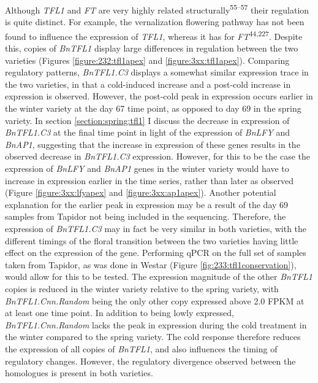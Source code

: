 \documentclass[12pt,]{book}
\begin{document}
Although \emph{TFL1} and \emph{FT} are very highly related
structurally\textsuperscript{55--57} their regulation is quite distinct.
For example, the vernalization flowering pathway has not been found to
influence the expression of \emph{TFL1}, whereas it has for
\emph{FT}\textsuperscript{44,227}. Despite this, copies of \emph{BnTFL1}
display large differences in regulation between the two varieties
(Figures \ref{figure:232:tfl1apex} and \ref{figure:3xx:tfl1apex}).
Comparing regulatory patterns, \emph{BnTFL1.C3} displays a somewhat
similar expression trace in the two varieties, in that a cold-induced
increase and a post-cold increase in expression is observed. However,
the post-cold peak in expression occurs earlier in the winter variety at
the day 67 time point, as opposed to day 69 in the spring variety. In
section \ref{section:spring:tfl1} I discuss the decrease in expression
of \emph{BnTFL1.C3} at the final time point in light of the expression
of \emph{BnLFY} and \emph{BnAP1}, suggesting that the increase in
expression of these genes results in the observed decrease in
\emph{BnTFL1.C3} expression. However, for this to be the case the
expression of \emph{BnLFY} and \emph{BnAP1} genes in the winter variety
would have to increase in expression earlier in the time series, rather
than later as observed (Figure \ref{figure:3xx:lfyapex} and
\ref{figure:3xx:ap1apex}). Another potential explanation for the earlier
peak in expression may be a result of the day 69 samples from Tapidor
not being included in the sequencing. Therefore, the expression of
\emph{BnTFL1.C3} may in fact be very similar in both varieties, with the
different timings of the floral transition between the two varieties
having little effect on the expression of the gene. Performing qPCR on
the full set of samples taken from Tapidor, as was done in Westar
(Figure \ref{fig:233:tfl1conservation}), would allow for this to be
tested. The expression magnitude of the other \emph{BnTFL1} copies is
reduced in the winter variety relative to the spring variety, with
\emph{BnTFL1.Cnn.Random} being the only other copy expressed above 2.0
FPKM at at least one time point. In addition to being lowly expressed,
\emph{BnTFL1.Cnn.Random} lacks the peak in expression during the cold
treatment in the winter compared to the spring variety. The cold
response therefore reduces the expression of all copies of
\emph{BnTFL1}, and also influences the timing of regulatory changes.
However, the regulatory divergence observed between the homologues is
present in both varieties.
\end{document}
